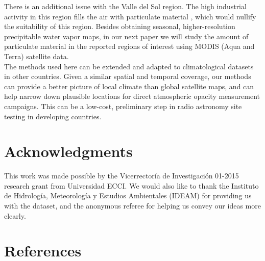 \documentclass[12pt]{iopart}
\begin{document}
There is an additional issue with the Valle del Sol region. The high industrial activity in this region fills the air with particulate material \cite{sogphd,sogamoso}, which would nullify the suitability of this region. Besides obtaining seasonal, higher-resolution precipitable water vapor maps, in our next paper we will study the amount of particulate material in the reported regions of interest using MODIS (Aqua and Terra) satellite data.\\
  
The methods used here can be extended and adapted to climatological datasets in other countries. Given a similar spatial and temporal coverage, our methods can provide a better picture of local climate than global satellite maps, and can help narrow down plausible locations for direct atmospheric opacity measurement campaigns. This can be a low-cost, preliminary step in radio astronomy site testing in developing countries.

\section*{Acknowledgments}

This work was made possible by the Vicerrector\'ia de Investigaci\'on 01-2015 research grant from Universidad ECCI. We would also like to thank the Instituto de Hidrolog\'ia, Meteorolog\'ia y Estudios Ambientales (IDEAM) for providing us with the dataset, and the anonymous referee for helping us convey our ideas more clearly.


 \section*{References}
 

  
  
\end{document}
